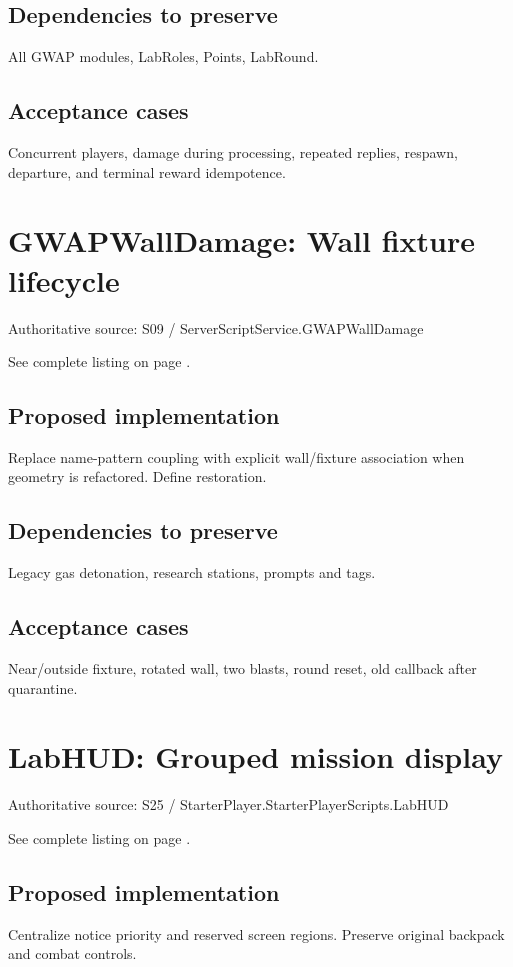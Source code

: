 \subsection{Dependencies to preserve}
All GWAP modules, LabRoles, Points, LabRound.\allowbreak{}

\subsection{Acceptance cases}
Concurrent players, damage during processing, repeated replies, respawn, departure, and terminal reward idempotence.\allowbreak{}

\section{GWAPWallDamage: Wall fixture lifecycle}
Authoritative source: S09 /\allowbreak{} ServerScriptService.\allowbreak{}GWAPWallDamage

See complete listing on page \pageref{src:S09}.

\subsection{Proposed implementation}
Replace name-pattern coupling with explicit wall/\allowbreak{}fixture association when geometry is refactored.\allowbreak{} Define restoration.\allowbreak{}

\subsection{Dependencies to preserve}
Legacy gas detonation, research stations, prompts and tags.\allowbreak{}

\subsection{Acceptance cases}
Near/\allowbreak{}outside fixture, rotated wall, two blasts, round reset, old callback after quarantine.\allowbreak{}

\section{LabHUD: Grouped mission display}
Authoritative source: S25 /\allowbreak{} StarterPlayer.\allowbreak{}StarterPlayerScripts.\allowbreak{}LabHUD

See complete listing on page \pageref{src:S25}.

\subsection{Proposed implementation}
Centralize notice priority and reserved screen regions.\allowbreak{} Preserve original backpack and combat controls.\allowbreak{}

